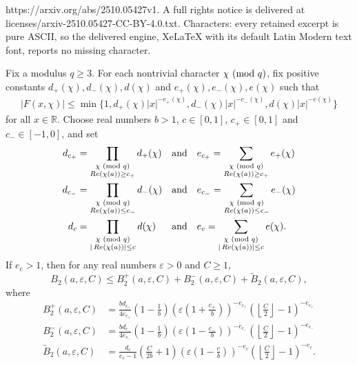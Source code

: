 \documentclass[10pt,a4paper]{amsart}
\newcommand{\R}{\mathbb R}
\renewcommand{\Re}{\mathop{\rm Re}}
\renewcommand{\mod}[1]{{\ifmmode\text{\rm\ (mod~$#1$)}\else\discretionary{}{}{\hbox{\!\!}}\rm(mod~$#1$)\fi}}
\begin{document}
https://arxiv.org/abs/2510.05427v1. A full rights notice is delivered at licenses/arxiv-2510.05427-CC-BY-4.0.txt. Characters: every retained excerpt is pure ASCII, so the delivered engine, XeLaTeX with its default Latin Modern text font, reports no missing character.
\begin{prop}\label{proposition bound 2}
Fix a modulus $q\ge3$. For each nontrivial character $\chi\mod q$, fix positive constants $d_+(\chi),d_-(\chi),d(\chi)$ and $e_+(\chi),e_-(\chi),e(\chi)$ such that
\begin{align} \label{F bound polynomial}
|F(x,\chi)|\le \min\{ 1, d_+(\chi)|x|^{-e_+(\chi)}, d_-(\chi)|x|^{-e_-(\chi)}, d(\chi)|x|^{-e(\chi)} \}
\end{align}
for all $x\in\R$.
Choose real numbers $b>1$, $c\in[0,1]$, $c_+\in[0,1]$ and $c_-\in[-1,0]$, and set
\[
\begin{alignedat}{2}
d_{c_+} &= \prod_{\substack{\chi \mod{q}\\ \Re(\chi(a))\ge c_+}} d_+(\chi) &\quad\text{and}\quad& e_{c_+} = \sum_{\substack{\chi \mod{q}\\ \Re(\chi(a))\ge c_+}}e_+(\chi) \\
d_{c_-} &= \prod_{\substack{\chi \mod{q}\\ \Re(\chi(a))\le c_-}} d_-(\chi) &\quad\text{and}\quad& e_{c_-} = \sum_{\substack{\chi \mod{q}\\ \Re(\chi(a))\le c_-}} e_-(\chi) \\
d_c &= \prod_{\substack{\chi \mod{q}\\ |\Re(\chi(a))|\le c}} d(\chi) &\quad\text{and}\quad& e_c = \sum_{\substack{\chi \mod{q}\\ |\Re(\chi(a))|\le c}} e(\chi).
\end{alignedat}
\]
If $e_c>1$, then for any real numbers $\varepsilon>0$ and $C\ge1$,
\begin{equation} \label{triple threat}
B_2(a,\varepsilon,C)\le B_2^+(a,\varepsilon,C)+B_2^-(a,\varepsilon,C)+\widetilde{B}_2(a,\varepsilon,C),
\end{equation}
where
\begin{align*}
B_2^+(a,\varepsilon,C) &= \frac{bd_{c_+}}{4e_{c_+}}\left(1-\frac1{b}\right)\left(\varepsilon\left(1 +\frac{c_+}{b}\right)\right)^{-e_{c_+}}\left(\left\lfloor\frac{C}{2}\right\rfloor-1\right)^{-e_{c_+}} \\
B_2^-(a,\varepsilon,C) &= \frac{bd_{c_-}}{4e_{c_-}}\left(1-\frac1{b}\right)\left(\varepsilon\left(1 -\frac{c_-}{b}\right)\right)^{-e_{c_-}}\left(\left\lfloor\frac{C}{2}\right\rfloor-1\right)^{-e_{c_-}} \\
\widetilde{B}_2(a,\varepsilon,C) &= \frac{d_c}{e_c-1}\left(\frac C{2b}+1 \right) \left(\varepsilon\left(1-\frac{c}{b}\right)\right)^{-e_c}\left(\left\lfloor\frac{C}{2}\right\rfloor-1\right)^{-e_c}.
\end{align*}
\end{prop}
\end{document}
